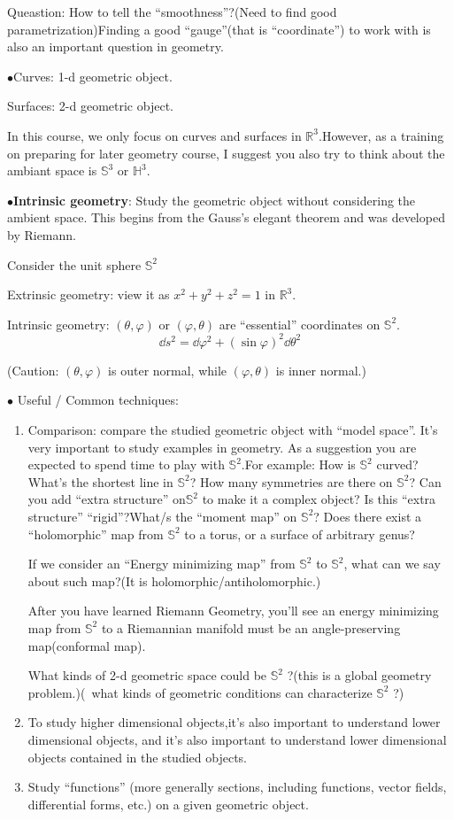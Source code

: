 Queastion: How to tell the ``smoothness''?(Need to find good parametrization)Finding a good ``gauge''(that is ``coordinate'') to work with is also an important question in geometry.

$\bullet$Curves: 1-d geometric object.

Surfaces: 2-d geometric object.
\begin{remark}
    In this course, we only focus on curves and surfaces in $\mathbb{R}^3$.However, as a training on preparing for later geometry course, I suggest you also try to think about the ambiant space is $\mathbb{S}^3$ or $\mathbb{H}^3$.

\end{remark}
$\bullet$\textbf{Intrinsic geometry}: Study the geometric object without considering the ambient space. This begins from the Gauss's elegant theorem and was developed by Riemann.
\begin{example}
    Consider the unit sphere $\mathbb{S}^2$

    Extrinsic geometry: view it as $x^2+y^2+z^2=1$ in $\mathbb{R}^3$.

    Intrinsic geometry: $(\theta,\varphi)$ or $(\varphi,\theta)$ are ``essential'' coordinates on $\mathbb{S}^2$. \[
        \dd s^2=\dd \varphi^2+(\sin\varphi)^2 \dd\theta^2
    \]

    (Caution: $(\theta,\varphi)$ is outer normal, while $(\varphi,\theta)$ is inner normal.)
\end{example}
$\bullet$ Useful / Common techniques:
\begin{enumerate}[1)]
    \item Comparison: compare the studied geometric object with ``model space''. It's very important to study examples in geometry. As a suggestion you are expected to spend time to play with $\mathbb{S}^2$.For example: How is $\mathbb{S}^2$ curved? What's the shortest line in $\mathbb{S}^2$? How many symmetries are there on $\mathbb{S}^2$? Can you add ``extra structure'' on$\mathbb{S}^2$ to make it a complex object? Is this ``extra structure'' ``rigid''?What/s the ``moment map'' on $\mathbb{S}^2$? Does there exist a ``holomorphic'' map from $\mathbb{S}^2$ to a torus, or a surface of arbitrary genus? 
 
    If we consider an ``Energy minimizing map'' from $\mathbb{S}^2$ to $\mathbb{S}^2$, what can we say about such map?(It is  holomorphic/antiholomorphic.)
 
    After you have learned Riemann Geometry, you'll see an energy minimizing map from $\mathbb{S}^2$ to a Riemannian manifold must be an angle-preserving map(conformal map).
 
    What kinds of 2-d geometric space could be $\mathbb{S}^2$ ?(this is a global geometry problem.)(\ie\ what kinds of geometric conditions can characterize $\mathbb{S}^2$ ?)
    \item To study higher dimensional objects,it's also important to understand lower dimensional objects, and it's also important to understand lower dimensional objects contained in the studied objects.
    \item Study ``functions'' (more generally sections, including functions, vector fields, differential forms, etc.) on a given geometric object.
\end{enumerate}
